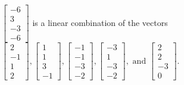 \begin{exercise}
\begin{exerciseStatement}
  \end{exerciseStatement}
  \begin{exerciseAnswer}
   \(\left[\begin{array}{c}
-6 \\
3 \\
-3 \\
-6
\end{array}\right]\) 
  	 is  
	a linear combination of the vectors \(\left[\begin{array}{c}
2 \\
-1 \\
1 \\
2
\end{array}\right] , \left[\begin{array}{c}
1 \\
1 \\
3 \\
-1
\end{array}\right] , \left[\begin{array}{c}
-1 \\
-1 \\
-3 \\
-2
\end{array}\right] , \left[\begin{array}{c}
-3 \\
1 \\
-3 \\
-2
\end{array}\right] , \text{ and } \left[\begin{array}{c}
2 \\
2 \\
-3 \\
0
\end{array}\right]\).

	
  


  \end{exerciseAnswer}
\end{exercise}